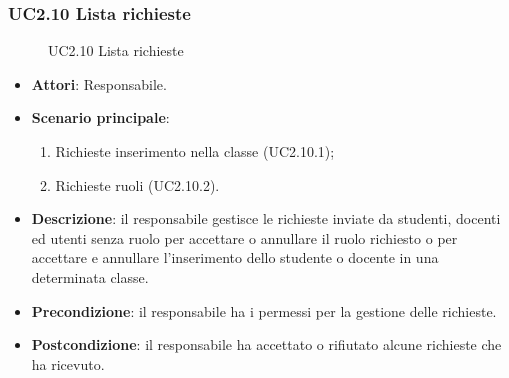 \subsubsection{UC2.10 Lista richieste}
\begin{figure}[H]
\centering
\noindent{}
\caption{UC2.10 Lista richieste}
\end{figure}
\begin{itemize}
\item \textbf{Attori}: Responsabile.
\item \textbf{Scenario principale}:
\begin{enumerate}
\item Richieste inserimento nella classe (UC2.10.1);
\item Richieste ruoli (UC2.10.2).
\end{enumerate}
\item \textbf{Descrizione}: il responsabile gestisce le richieste inviate da studenti, docenti ed utenti senza ruolo per accettare o annullare il ruolo richiesto o per accettare e annullare l’inserimento dello studente o docente in una determinata classe.
\item \textbf{Precondizione}: il responsabile ha i permessi per la gestione delle richieste.
\item \textbf{Postcondizione}: il responsabile ha accettato o rifiutato alcune richieste che ha ricevuto.
\end{itemize}
